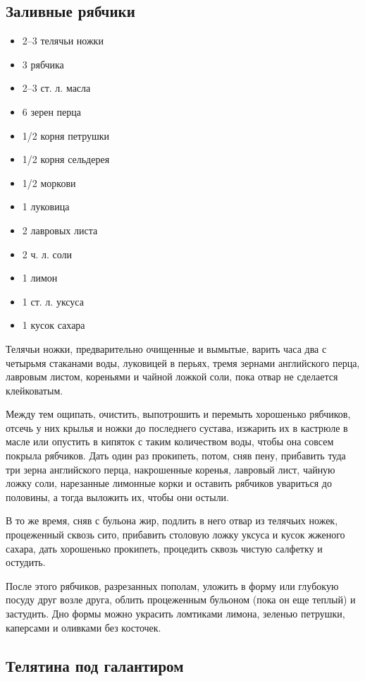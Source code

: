 \subsection{Заливные рябчики}

\begin{itemize}
	\item 2–3 телячьи ножки
    \item 3 рябчика 
    \item 2–3 ст. л. масла
    \item 6 зерен перца 
    \item 1/2 корня петрушки
    \item 1/2 корня сельдерея
    \item 1/2 моркови
    \item 1 луковица
    \item 2 лавровых листа
    \item 2 ч. л. соли 
    \item 1 лимон 
    \item 1 ст. л. уксуса
    \item 1 кусок сахара
\end{itemize}

Телячьи ножки, предварительно очищенные и вымытые, варить часа два с четырьмя стаканами воды, луковицей в перьях, тремя зернами английского перца, лавровым листом, кореньями и чайной ложкой соли, пока отвар не сделается клейковатым.

Между тем ощипать, очистить, выпотрошить и перемыть хорошенько рябчиков, отсечь у них крылья и ножки до последнего сустава, изжарить их в кастрюле в масле или опустить в кипяток с таким количеством воды, чтобы она совсем покрыла рябчиков. Дать один раз прокипеть, потом, сняв пену, прибавить туда три зерна английского перца, накрошенные коренья, лавровый лист, чайную ложку соли, нарезанные лимонные корки и оставить рябчиков увариться до половины, а тогда выложить их, чтобы они остыли.

В то же время, сняв с бульона жир, подлить в него отвар из телячьих ножек, процеженный сквозь сито, прибавить столовую ложку уксуса и кусок жженого сахара, дать хорошенько прокипеть, процедить сквозь чистую салфетку и остудить.

После этого рябчиков, разрезанных пополам, уложить в форму или глубокую посуду друг возле друга, облить процеженным бульоном (пока он еще теплый) и застудить. Дно формы можно украсить ломтиками лимона, зеленью петрушки, каперсами и оливками без косточек.

\subsection{Телятина под галантиром}


